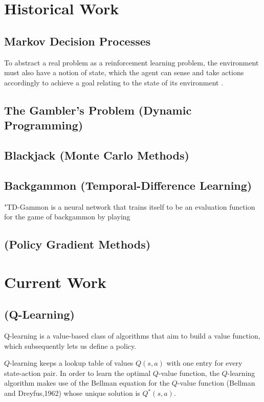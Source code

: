 \documentclass{article}
\begin{document}
\section{Historical Work}

\subsection{Markov Decision Processes}

To abstract a real problem as a reinforcement learning problem, the environment 
must also have a notion of state, which the agent can sense and take actions accordingly to achieve a goal 
relating to the state of its environment \cite{Sutton1998}.

\subsection{The Gambler's Problem (Dynamic Programming)}

\subsection{Blackjack (Monte Carlo Methods)}

\subsection{Backgammon (Temporal-Difference Learning)}

"TD-Gammon is a neural network that trains itself to be an evaluation function for the game of backgammon by playing 

\subsection{(Policy Gradient Methods)}

\section{Current Work}

\subsection{(Q-Learning)}
Q-learning is a value-based class of algorithms that aim to build a value function, which subsequently lets us define a policy.

$Q$-learning keeps a lookup table of values $Q(s,a)$ with one entry for every state-action pair. In order to learn the optimal $Q$-value function, the $Q$-learning algorithm makes use of the Bellman equation for the $Q$-value function (Bellman and Dreyfus,1962) whose unique solution is $Q^*(s,a)$.
\end{document}
